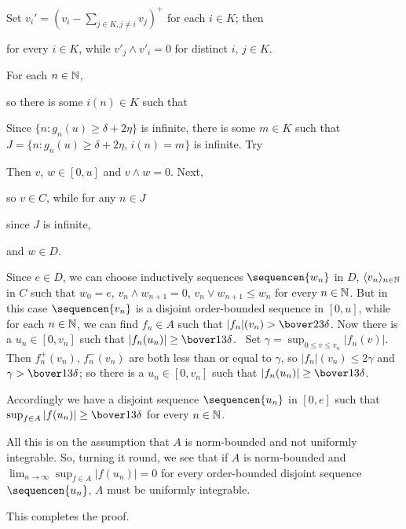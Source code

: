 {Set $v_i'=(v_i-\sum_{j\in K,j\ne i}v_j)^+$ for each $i\in K$;  then


\noindent for every $i\in K$, while $v'_j\wedge v'_i=0$ for distinct
$i$, $j\in K$.

For each $n\in\Bbb N$,


\noindent so there is some $i(n)\in K$ such that


\noindent Since $\{n:g_n(u)\ge\delta+2\eta\}$ is infinite, there is some
$m\in K$ such that $J=\{n:g_n(u)\ge\delta+2\eta,\,i(n)=m\}$ is infinite.
Try


\noindent Then $v$, $w\in[0,u]$ and $v\wedge w=0$.   Next,


\noindent so $v\in C$, while for any $n\in J$


\noindent since $J$ is infinite,


\noindent and $w\in D$.\ \Qed

\medskip

 Since $e\in D$, we can choose inductively sequences
$\sequencen{w_n}$ in $D$, $\langle v_n\rangle_{n\in\Bbb N}$ in $C$ such
that $w_0=e$, $v_n\wedge w_{n+1}=0$, $v_n\vee w_{n+1}\le w_n$ for every
$n\in\Bbb N$.   But in this case $\sequencen{v_n}$ is a disjoint
order-bounded sequence in $[0,u]$, while
for each $n\in\Bbb N$, we can find $f_n\in A$ such that
$|f_n|(v_n)>\bover23\delta$.   Now there is a $u_n\in[0,v_n]$ such that
$|f_n(u_n)|\ge\bover13\delta$.   \Prf\ Set $\gamma=\sup_{0\le v\le
v_n}|f_n(v)|$.   Then $f_n^+(v_n)$, $f^-_n(v_n)$ are both less than or
equal to $\gamma$, so $|f_n|(v_n)\le 2\gamma$ and
$\gamma>\bover13\delta$;  so there is a $u_n\in[0,v_n]$ such that
$|f_n(u_n)|\ge\bover13\delta$.\ \Qed

Accordingly we have a disjoint sequence $\sequencen{u_n}$ in $[0,e]$
such that $\sup_{f\in A}|f(u_n)|\ge\bover13\delta$ for every
$n\in\Bbb N$.

\medskip

 All this is on the assumption that $A$ is norm-bounded and
not uniformly integrable.   So, turning it round, we see that if $A$ is
norm-bounded and $\lim_{n\to\infty}\sup_{f\in A}|f(u_n)|=0$ for every
order-bounded disjoint sequence $\sequencen{u_n}$, $A$ must be uniformly
integrable.

This completes the proof.
}%

